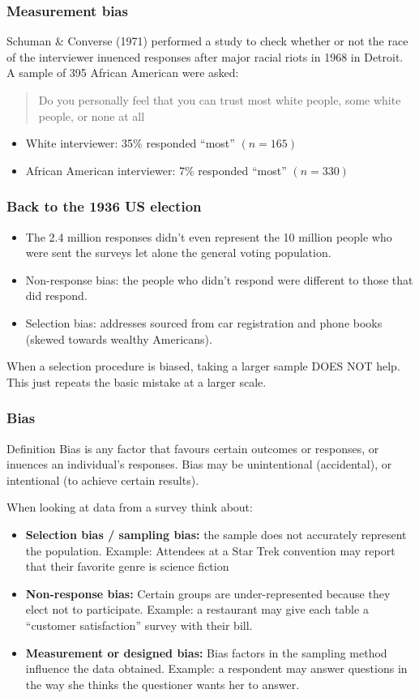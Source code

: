 \documentclass[a4paper]{article}
\begin{document}
\subsubsection{Measurement bias}
Schuman \& Converse (1971) performed a study to check whether or not the race of the interviewer inuenced responses after major racial riots in 1968 in Detroit. A sample of 395 African American were asked:
\begin{tcolorbox}[bluestyleline]
	\blockquote{Do you personally feel that you can trust most white people, some white people, or none at all}
\end{tcolorbox}
\begin{itemize}
    \item White interviewer: 35\% responded ``most'' \( (n=165) \)
    \item African American interviewer: 7\% responded ``most'' \( (n=330) \)
\end{itemize}
\subsubsection{Back to the 1936 US election}
\begin{itemize}
	\item The 2.4 million responses didn't even represent the 10 million people who were sent the surveys let alone the general voting population.
	\item Non-response bias: the people who didn't respond were different to those that did respond.
	\item Selection bias: addresses sourced from car registration and phone books (skewed towards wealthy Americans).
\end{itemize}
\begin{goldbox}
	When a selection procedure is biased, taking a larger sample DOES NOT help. This just repeats the basic mistake at a larger scale.
\end{goldbox}
\subsubsection{Bias}
\begin{bluebox}{Definition}
	Bias is any factor that favours certain outcomes or responses, or inuences an individual's responses. Bias may be unintentional (accidental), or intentional (to achieve certain results).
\end{bluebox}
When looking at data from a survey think about:
\begin{itemize}
	\item \textbf{Selection bias / sampling bias:} the sample does not accurately represent the population. Example: Attendees at a Star Trek convention may report that their favorite genre is science fiction
	\item \textbf{Non-response bias:} Certain groups are under-represented because they elect not to participate. Example: a restaurant may give each table a ``customer satisfaction'' survey with their bill.
	\item \textbf{Measurement or designed bias:} Bias factors in the sampling method influence the data obtained. Example: a respondent may answer questions in the way she thinks the questioner wants her to answer.		
\end{itemize}
\end{document}
